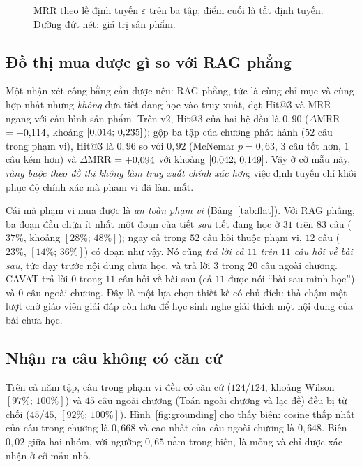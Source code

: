 \begin{figure}[tp]
\centering

\caption{MRR theo lề định tuyến $\varepsilon$ trên ba tập; điểm cuối là tắt định tuyến. Đường đứt nét: giá trị sản phẩm.}
\label{fig:sweep}
\end{figure}

\subsection{Đồ thị mua được gì so với RAG phẳng}\label{sec:flat}
Một nhận xét công bằng cần được nêu: RAG phẳng, tức là cùng chỉ mục và cùng hợp nhất nhưng \emph{không} đưa tiết đang học vào truy xuất, đạt Hit@3 và MRR ngang với cấu hình sản phẩm. Trên v2, Hit@3 của hai hệ đều là $0{,}90$ ($\Delta$MRR $=+0{,}114$, khoảng $[0{,}014;\,0{,}235]$); gộp ba tập của chương phát hành ($52$ câu trong phạm vi), Hit@3 là $0{,}96$ so với $0{,}92$ (McNemar $p=0{,}63$, $3$ câu tốt hơn, $1$ câu kém hơn) và $\Delta$MRR $=+0{,}094$ với khoảng $[0{,}042;\,0{,}149]$. Vậy ở cỡ mẫu này, \emph{ràng buộc theo đồ thị không làm truy xuất chính xác hơn}; việc định tuyến chỉ khôi phục độ chính xác mà phạm vi đã làm mất.

Cái mà phạm vi mua được là \emph{an toàn phạm vi} (Bảng~\ref{tab:flat}). Với RAG phẳng, ba đoạn đầu chứa ít nhất một đoạn của tiết \emph{sau} tiết đang học ở $31$ trên $83$ câu ($37\%$, khoảng $[28\%;\,48\%]$); ngay cả trong $52$ câu hỏi thuộc phạm vi, $12$ câu ($23\%$, $[14\%;\,36\%]$) có đoạn như vậy. Nó cũng \emph{trả lời cả $11$ trên $11$ câu hỏi về bài sau}, tức dạy trước nội dung chưa học, và trả lời $3$ trong $20$ câu ngoài chương. CAVAT trả lời $0$ trong $11$ câu hỏi về bài sau (cả $11$ được nói ``bài sau mình học'') và $0$ câu ngoài chương. Đây là một lựa chọn thiết kế có chủ đích: thà chậm một lượt chờ giáo viên giải đáp còn hơn để học sinh nghe giải thích một nội dung của bài chưa học.

\begin{table}[tp]
\centering
\caption{CAVAT và RAG phẳng trên ba tập của chương phát hành. ``Đoạn bài sau trong top-3'': số câu mà ba đoạn đầu chứa đoạn của tiết đứng sau tiết đang học (trên tổng số câu của tập). ``Bị trả lời'': số câu mà hệ sẽ đưa lời giải thích có căn cứ, thay vì nói ``bài sau'' hoặc giữ cho giáo viên.}
\label{tab:flat}

\end{table}

\subsection{Nhận ra câu không có căn cứ}\label{sec:grounding-res}
Trên cả năm tập, \NQuestionsInScope{} câu trong phạm vi đều có căn cứ ($124$/$124$, khoảng Wilson $[97\%;\,100\%]$) và $45$ câu ngoài chương (Toán ngoài chương và lạc đề) đều bị từ chối ($45$/$45$, $[92\%;\,100\%]$). Hình~\ref{fig:grounding} cho thấy biên: cosine thấp nhất của câu trong chương là $0{,}668$ và cao nhất của câu ngoài chương là $0{,}648$. Biên $0{,}02$ giữa hai nhóm, với ngưỡng $0{,}65$ nằm trong biên, là mỏng và chỉ được xác nhận ở cỡ mẫu nhỏ.

